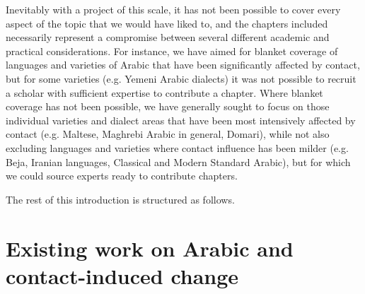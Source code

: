 \documentclass[output=paper]{langsci/langscibook}
\begin{document}
Inevitably with a project of this scale, it has not been possible to cover every  aspect of the topic that we would have liked to, and the chapters included necessarily represent a compromise between several different academic and practical considerations. For instance, we have aimed for blanket coverage of languages and varieties of Arabic that have been significantly affected by contact, but for some varieties (e.g. Yemeni Arabic dialects) it was not possible to recruit a scholar with sufficient expertise to contribute a chapter. Where blanket coverage has not been possible, we have generally sought to focus on those individual varieties and dialect areas that have been most intensively affected by contact (e.g. Maltese, Maghrebi Arabic in general, Domari), while not also excluding languages and varieties where contact influence has been milder (e.g. Beja, Iranian languages, Classical and Modern Standard Arabic), but for which we could source experts ready to contribute chapters.

The rest of this introduction is structured as follows. 




\section{Existing work on Arabic and contact-induced change}\label{introexistingwork}
\end{document}
